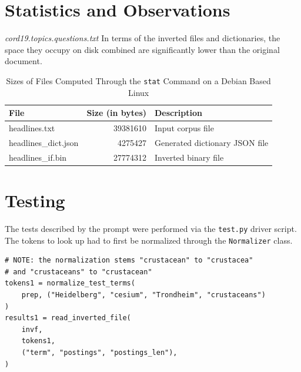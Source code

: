 \documentclass[11pt]{article}
\begin{document}
\section{Statistics and Observations}
\textit{cord19.topics.questions.txt}
In terms of the inverted files and dictionaries, the space they occupy on disk combined are significantly lower than the original document.

\begin{table}[h]
    \begin{center}
        
        \begin{tabular}{| l | r | l |}
        \hline
        \textbf{File} & \textbf{Size (in bytes)} & \textbf{Description} \\
        \hline
        headlines.txt & 39381610 & Input corpus file \\
        headlines\_dict.json & 4275427 & Generated dictionary JSON file \\
        headlines\_if.bin & 27774312 & Inverted binary file \\
        \hline
        \end{tabular}

    \end{center}
    \caption{Sizes of Files Computed Through the \texttt{stat} Command on a Debian Based Linux}

\end{table}

\section{Testing}
The tests described by the prompt were performed via the \texttt{test.py} driver script. The tokens to look up had to first be normalized through the \texttt{Normalizer} class.

\begin{lstlisting}[style=mypython,
    caption=Test 1: Document frequency and postings list for the terms: "Heidelberg"\, "cesium"\, "Trondheim"\, "crustacean"]
# NOTE: the normalization stems "crustacean" to "crustacea"
# and "crustaceans" to "crustacean"
tokens1 = normalize_test_terms(
    prep, ("Heidelberg", "cesium", "Trondheim", "crustaceans")
)
results1 = read_inverted_file(
    invf,
    tokens1,
    ("term", "postings", "postings_len"),
)
\end{lstlisting}

\end{document}
